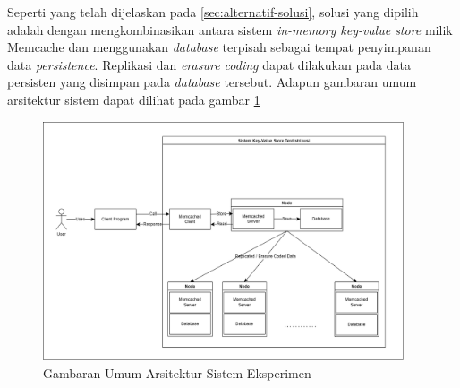 Seperti yang telah dijelaskan pada \ref{sec:alternatif-solusi}, solusi yang dipilih adalah dengan mengkombinasikan antara sistem \textit{in-memory key-value store} milik Memcache dan menggunakan \textit{database} terpisah sebagai tempat penyimpanan data \textit{persistence}. Replikasi dan \textit{erasure coding} dapat dilakukan pada data persisten yang disimpan pada \textit{database} tersebut. Adapun gambaran umum arsitektur sistem dapat dilihat pada gambar \ref{fig:general-architecture}

\begin{figure}[ht]
    \centering
    \includegraphics[width=0.95\textwidth]{resources/chapter-3/general-architecture.png}
    \caption{Gambaran Umum Arsitektur Sistem Eksperimen}
    \label{fig:general-architecture}
  \end{figure}